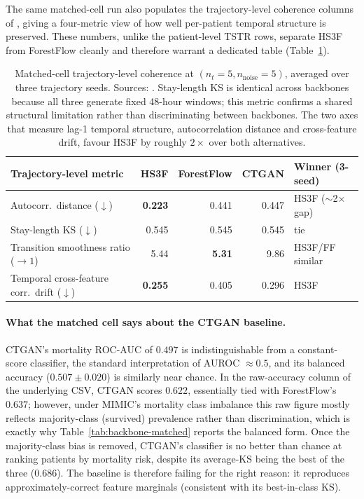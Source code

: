 The same matched-cell run also populates the trajectory-level coherence columns of , giving a four-metric view of how well per-patient temporal structure is preserved. These numbers, unlike the patient-level TSTR rows, separate HS3F from ForestFlow cleanly and therefore warrant a dedicated table (Table~\ref{tab:backbone-trajectory}).

\begin{table}[htbp]
\centering
\small
\setlength{\tabcolsep}{4pt}
\begin{tabularx}{\textwidth}{@{}lrrr>{\raggedright\arraybackslash}X@{}}
\toprule
\textbf{Trajectory-level metric} & \textbf{HS3F} & \textbf{ForestFlow} & \textbf{CTGAN} & \textbf{Winner (3-seed)} \\
\midrule
Autocorr.\ distance ($\downarrow$)                         & \textbf{0.223} & 0.441 & 0.447 & HS3F ($\sim$2$\times$ gap) \\
Stay-length KS ($\downarrow$)                              & 0.545 & 0.545 & 0.545 & tie \\
Transition smoothness ratio ($\to 1$)                      & 5.44           & \textbf{5.31} & 9.86  & HS3F/FF similar \\
Temporal cross-feature corr.\ drift ($\downarrow$)         & \textbf{0.255} & 0.405 & 0.296 & HS3F \\
\bottomrule
\end{tabularx}
\caption{Matched-cell trajectory-level coherence at $(n_t{=}5, n_{\text{noise}}{=}5)$, averaged over three trajectory seeds. Sources: . Stay-length KS is identical across backbones because all three generate fixed 48-hour windows; this metric confirms a shared structural limitation rather than discriminating between backbones. The two axes that measure lag-1 temporal structure, autocorrelation distance and cross-feature drift, favour HS3F by roughly $2\times$ over both alternatives.}
\label{tab:backbone-trajectory}
\end{table}

\paragraph{What the matched cell says about the CTGAN baseline.}
CTGAN's mortality ROC-AUC of $0.497$ is indistinguishable from a constant-score classifier, the standard interpretation of AUROC $\approx 0.5$, and its balanced accuracy ($0.507 \pm 0.020$) is similarly near chance. In the raw-accuracy column of the underlying CSV, CTGAN scores $0.622$, essentially tied with ForestFlow's $0.637$; however, under MIMIC's mortality class imbalance this raw figure mostly reflects majority-class (survived) prevalence rather than discrimination, which is exactly why Table~\ref{tab:backbone-matched} reports the balanced form. Once the majority-class bias is removed, CTGAN's classifier is no better than chance at ranking patients by mortality risk, despite its average-KS being the best of the three ($0.686$). The baseline is therefore failing for the right reason: it reproduces approximately-correct feature marginals (consistent with its best-in-class KS).

